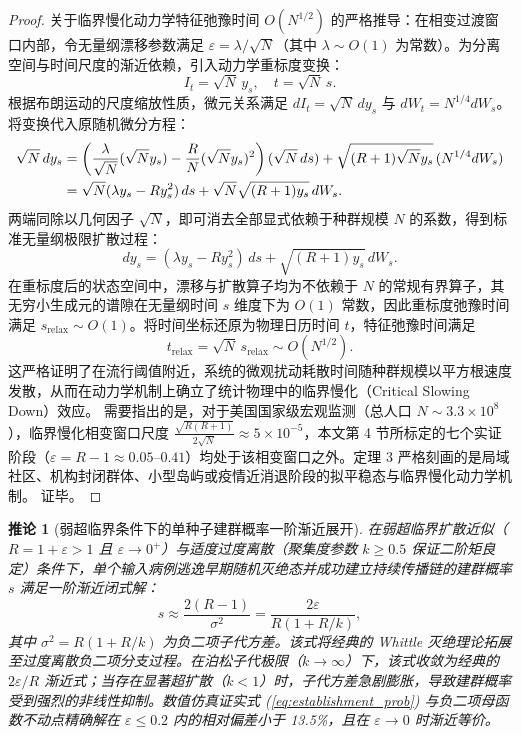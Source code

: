 \documentclass[11pt,a4paper]{article}
\theoremstyle{plain}
\newtheorem{corollary}{推论}
\theoremstyle{definition}
\begin{document}
\begin{proof}
关于临界慢化动力学特征弛豫时间 $O(N^{1/2})$ 的严格推导：在相变过渡窗口内部，令无量纲漂移参数满足 $\varepsilon = \lambda / \sqrt{N}$（其中 $\lambda \sim O(1)$ 为常数）。为分离空间与时间尺度的渐近依赖，引入动力学重标度变换：
\begin{equation}
I_t = \sqrt{N}\, y_s, \quad t = \sqrt{N}\, s.
\end{equation}
根据布朗运动的尺度缩放性质，微元关系满足 $dI_t = \sqrt{N}\, dy_s$ 与 $dW_t = N^{1/4} dW_s$。将变换代入原随机微分方程：
\begin{align}
\sqrt{N}\, dy_s &= \left( \frac{\lambda}{\sqrt{N}} (\sqrt{N} y_s) - \frac{R}{N} (\sqrt{N} y_s)^2 \right) (\sqrt{N}\, ds) + \sqrt{(R+1)\sqrt{N} y_s}\, (N^{1/4} dW_s) \notag \\
&= \sqrt{N} (\lambda y_s - R y_s^2)\, ds + \sqrt{N} \sqrt{(R+1)y_s}\, dW_s.
\end{align}
两端同除以几何因子 $\sqrt{N}$，即可消去全部显式依赖于种群规模 $N$ 的系数，得到标准无量纲极限扩散过程：
\begin{equation}
dy_s = (\lambda y_s - R y_s^2)\, ds + \sqrt{(R+1)y_s}\, dW_s.
\end{equation}
在重标度后的状态空间中，漂移与扩散算子均为不依赖于 $N$ 的常规有界算子，其无穷小生成元的谱隙在无量纲时间 $s$ 维度下为 $O(1)$ 常数，因此重标度弛豫时间满足 $s_{\text{relax}} \sim O(1)$。将时间坐标还原为物理日历时间 $t$，特征弛豫时间满足
\begin{equation}
t_{\text{relax}} = \sqrt{N}\, s_{\text{relax}} \sim O(N^{1/2}).
\end{equation}
这严格证明了在流行阈值附近，系统的微观扰动耗散时间随种群规模以平方根速度发散，从而在动力学机制上确立了统计物理中的临界慢化（Critical Slowing Down）效应。 需要指出的是，对于美国国家级宏观监测（总人口 $N \sim 3.3 \times 10^8$），临界慢化相变窗口尺度 $\frac{\sqrt{R(R+1)}}{2\sqrt{N}} \approx 5 \times 10^{-5}$，本文第 4 节所标定的七个实证阶段（$\varepsilon = R - 1 \approx 0.05\text{--}0.41$）均处于该相变窗口之外。定理 3 严格刻画的是局域社区、机构封闭群体、小型岛屿或疫情近消退阶段的拟平稳态与临界慢化动力学机制。
证毕。
\end{proof}

\begin{corollary}[弱超临界条件下的单种子建群概率一阶渐近展开]\label{cor:establishment}
在弱超临界扩散近似（$R = 1 + \varepsilon > 1$ 且 $\varepsilon \to 0^+$）与适度过度离散（聚集度参数 $k \ge 0.5$ 保证二阶矩良定）条件下，单个输入病例逃逸早期随机灭绝态并成功建立持续传播链的建群概率 $s$ 满足一阶渐近闭式解：
\begin{equation}
s \approx \frac{2(R-1)}{\sigma^2} = \frac{2\varepsilon}{R(1 + R/k)},
\label{eq:establishment_prob}
\end{equation}
其中 $\sigma^2 = R(1 + R/k)$ 为负二项子代方差。该式将经典的 Whittle 灭绝理论\citep{whittle1955outcome}拓展至过度离散负二项分支过程。在泊松子代极限（$k \to \infty$）下，该式收敛为经典的 $2\varepsilon/R$ 渐近式；当存在显著超扩散（$k < 1$）时，子代方差急剧膨胀，导致建群概率受到强烈的非线性抑制。数值仿真证实式 (\ref{eq:establishment_prob}) 与负二项母函数不动点精确解在 $\varepsilon \le 0.2$ 内的相对偏差小于 13.5\%，且在 $\varepsilon \to 0$ 时渐近等价。
\end{corollary}
\end{document}

